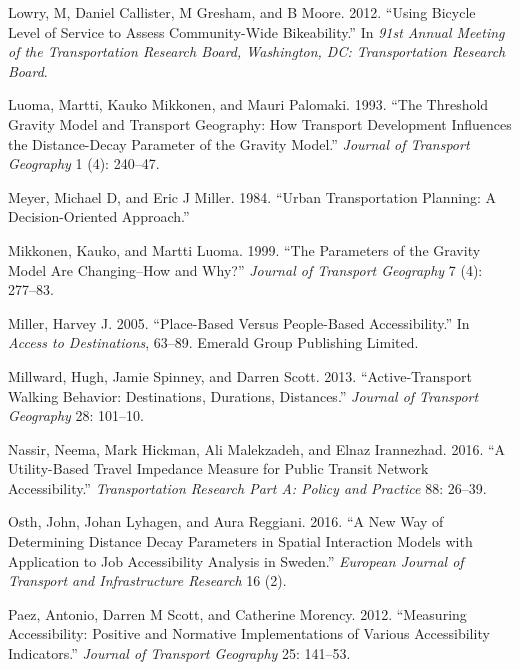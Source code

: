 \documentclass[preprint, 3p,
authoryear]{elsarticle} %
\newlength{\cslhangindent}
\newlength{\cslentryspacingunit} %
\newenvironment{CSLReferences}[2] %
 {%
  \setlength{\parindent}{0pt}
  \ifodd #1
  \let\oldpar\par
  \def\par{\hangindent=\cslhangindent\oldpar}
  \fi
  \setlength{\parskip}{#2\cslentryspacingunit}
 }%
 {}
\begin{document}
\begin{CSLReferences}{1}{0}
\leavevmode{}%
Lowry, M, Daniel Callister, M Gresham, and B Moore. 2012. {``Using
Bicycle Level of Service to Assess Community-Wide Bikeability.''} In
\emph{91st Annual Meeting of the Transportation Research Board,
Washington, DC: Transportation Research Board}.

\leavevmode{}%
Luoma, Martti, Kauko Mikkonen, and Mauri Palomaki. 1993. {``The
Threshold Gravity Model and Transport Geography: How Transport
Development Influences the Distance-Decay Parameter of the Gravity
Model.''} \emph{Journal of Transport Geography} 1 (4): 240--47.

\leavevmode{}%
Meyer, Michael D, and Eric J Miller. 1984. {``Urban Transportation
Planning: A Decision-Oriented Approach.''}

\leavevmode{}%
Mikkonen, Kauko, and Martti Luoma. 1999. {``The Parameters of the
Gravity Model Are Changing--How and Why?''} \emph{Journal of Transport
Geography} 7 (4): 277--83.

\leavevmode{}%
Miller, Harvey J. 2005. {``Place-Based Versus People-Based
Accessibility.''} In \emph{Access to Destinations}, 63--89. Emerald
Group Publishing Limited.

\leavevmode{}%
Millward, Hugh, Jamie Spinney, and Darren Scott. 2013.
{``Active-Transport Walking Behavior: Destinations, Durations,
Distances.''} \emph{Journal of Transport Geography} 28: 101--10.

\leavevmode{}%
Nassir, Neema, Mark Hickman, Ali Malekzadeh, and Elnaz Irannezhad. 2016.
{``A Utility-Based Travel Impedance Measure for Public Transit Network
Accessibility.''} \emph{Transportation Research Part A: Policy and
Practice} 88: 26--39.

\leavevmode{}%
Osth, John, Johan Lyhagen, and Aura Reggiani. 2016. {``A New Way of
Determining Distance Decay Parameters in Spatial Interaction Models with
Application to Job Accessibility Analysis in Sweden.''} \emph{European
Journal of Transport and Infrastructure Research} 16 (2).

\leavevmode{}%
Paez, Antonio, Darren M Scott, and Catherine Morency. 2012. {``Measuring
Accessibility: Positive and Normative Implementations of Various
Accessibility Indicators.''} \emph{Journal of Transport Geography} 25:
141--53.


\end{CSLReferences}
\end{document}
